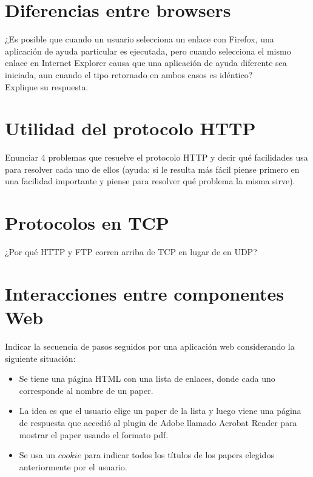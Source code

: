 \documentclass[12pt]{report}
\begin{document}
\section{Diferencias entre browsers \sone \steo}

¿Es posible que cuando un usuario selecciona un enlace con Firefox, una aplicación de ayuda particular es ejecutada, pero cuando selecciona el mismo enlace en Internet Explorer causa que una aplicación de ayuda diferente sea iniciada, aun cuando el tipo  retornado en ambos casos es
idéntico?\\ Explique su respuesta.

\section{Utilidad del protocolo HTTP \stwo \steo}

Enunciar 4 problemas que resuelve el protocolo HTTP y decir qué facilidades usa
para resolver cada uno de ellos (ayuda: si le resulta más fácil piense primero en una facilidad
importante y piense para resolver qué problema la misma sirve).


\section{Protocolos en TCP \sone \steo}

¿Por qué HTTP y FTP corren arriba de TCP en lugar de en UDP?

\section{Interacciones entre componentes Web \stwo}

Indicar la secuencia de pasos seguidos por una aplicación web considerando la
siguiente situación:

\begin{itemize}
\item Se tiene una página HTML con una lista de enlaces, donde cada uno corresponde al nombre de un paper.
\item La idea es que el usuario elige un paper de la lista y luego viene una página de respuesta que accedió al plugin de Adobe llamado Acrobat Reader para mostrar el paper usando el formato pdf.
\item Se usa un $cookie$ para indicar todos los títulos de los papers elegidos anteriormente por el usuario.
\end{itemize}
\end{document}
